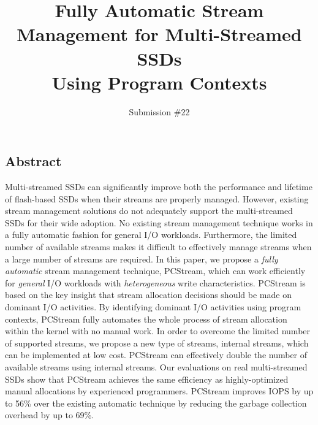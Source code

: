 \documentclass[letterpaper, twocolumn, 10pt]{article}
\begin{document}
\title{
\bf Fully Automatic Stream Management for Multi-Streamed SSDs \\ Using Program Contexts}


\author{
{\rm Submission \#22} \\
}



%


\maketitle
\subsection*{Abstract}
\vspace{-6pt}
Multi-streamed SSDs can significantly improve both the performance and lifetime
of flash-based SSDs when their streams are properly managed.  However, existing
stream management solutions do not adequately support the multi-streamed SSDs
for their wide adoption.  No existing stream management technique works in a
fully automatic fashion for general I/O workloads.
Furthermore, the limited number of available streams makes it
difficult to effectively manage streams when a large number of streams are
required.  In this paper, we propose a {\it fully automatic} stream management
technique, \textsf{\small PCStream}, which can work efficiently for {\it
general} I/O workloads with {\it heterogeneous} write characteristics.  
\textsf{\small PCStream} is based on the key insight
that stream allocation decisions should be made on dominant I/O activities. By
identifying dominant I/O activities using program contexts, \textsf{\small
PCStream} fully automates the whole process of stream allocation within the
kernel with no manual work.  In order to overcome the limited number of
supported streams, we propose a new type of streams, internal streams, which
can be implemented at low cost.  \textsf{\small PCStream} can effectively
double the number of available streams using internal streams.  Our evaluations
on real multi-streamed SSDs show that \textsf{\small PCStream} achieves the
same efficiency as highly-optimized manual allocations by experienced
programmers.  \textsf{\small PCStream} improves IOPS by up to 56\% over the
existing automatic technique by reducing the garbage collection overhead by up
to 69\%.
\end{document}
